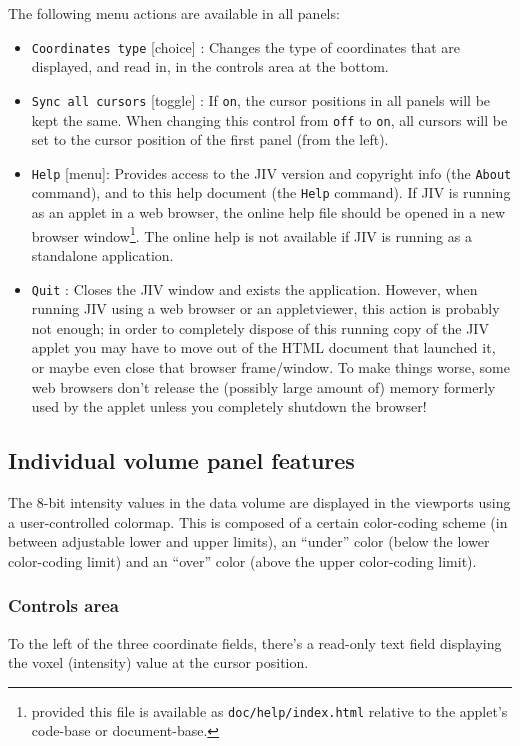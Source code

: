 The following menu actions are available in all panels:
\begin{itemize}
\item \verb+Coordinates type+ [choice] : Changes the type of
  coordinates that are displayed, and read in, in the controls area at
  the bottom.
\item \verb+Sync all cursors+ [toggle] : If \verb+on+, the cursor
  positions in all panels will be kept the same. When changing this
  control from \verb+off+ to \verb+on+, all cursors will be set to the
  cursor position of the first panel (from the left).
\item \verb+Help+ [menu]: Provides access to the JIV version and
  copyright info (the \verb+About+ command), and to this help document
  (the \verb+Help+ command). If JIV is running as an applet in a web
  browser, the online help file should be opened in a new browser
  window\footnote{provided this file is available as
    \texttt{doc/help/index.html} relative to the applet's code-base or
    document-base.}.  The online help is not available if JIV is
  running as a standalone application.
\item \verb+Quit+ : Closes the JIV window and exists the application.
  However, when running JIV using a web browser or an appletviewer,
  this action is probably not enough; in order to completely dispose
  of this running copy of the JIV applet you may have to move out of
  the HTML document that launched it, or maybe even close that browser
  frame/window. To make things worse, some web browsers don't release
  the (possibly large amount of) memory formerly used by the applet
  unless you completely shutdown the browser!
\end{itemize}

\subsection{Individual volume panel features}
\label{sec:individual-panel-features}
The 8-bit intensity values in the data volume are displayed in the
viewports using a user-controlled colormap.  This is composed of a
certain color-coding scheme (in between adjustable lower and upper
limits), an ``under'' color (below the lower color-coding limit) and
an ``over'' color (above the upper color-coding limit).

\subsubsection{Controls area}
To the left of the three coordinate fields, there's a read-only text
field displaying the voxel (intensity) value at the cursor position.

